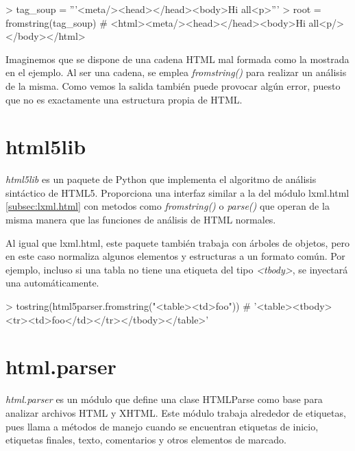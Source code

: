 \begin{Schunk}
    \begin{Soutput}
        > tag_soup = '''<meta/><head></head><body>Hi all<p>'''
        > root = fromstring(tag_soup)
        # <html><meta/><head></head><body>Hi all<p/></body></html>
    \end{Soutput}
\end{Schunk}

Imaginemos que se dispone de una cadena HTML mal formada como la mostrada en el ejemplo. Al ser una cadena,
se emplea \emph{fromstring()} para realizar un análisis de la misma. Como vemos la salida también puede
provocar algún error, puesto que no es exactamente una estructura propia de HTML.

\section{html5lib}
\label{sec:html5lib}

\emph{html5lib} \cite{html5lib} es un paquete de Python que implementa el algoritmo de análisis sintáctico 
de HTML5. Proporciona una interfaz similar a la del módulo lxml.html \ref{subsec:lxml.html} con metodos 
como \emph{fromstring()} o \emph{parse()} que operan de la misma manera que las funciones de análisis 
de HTML normales.

Al igual que lxml.html, este paquete también trabaja con árboles de objetos, pero en este caso normaliza 
algunos elementos y estructuras a un formato común. Por ejemplo, incluso si una tabla no tiene una etiqueta 
del tipo \emph{<tbody>}, se inyectará una automáticamente.

\begin{Schunk}
    \begin{Soutput}
        > tostring(html5parser.fromstring("<table><td>foo"))
        # '<table><tbody><tr><td>foo</td></tr></tbody></table>'
    \end{Soutput}
\end{Schunk}

\section{html.parser}
\label{sec:html.parser}

\emph{html.parser} \cite{html-parser} es un módulo que define una clase HTMLParse como base para analizar
archivos HTML y XHTML. Este módulo trabaja alrededor de etiquetas, pues llama a métodos de manejo cuando
se encuentran etiquetas de inicio, etiquetas finales, texto, comentarios y otros elementos de marcado.

